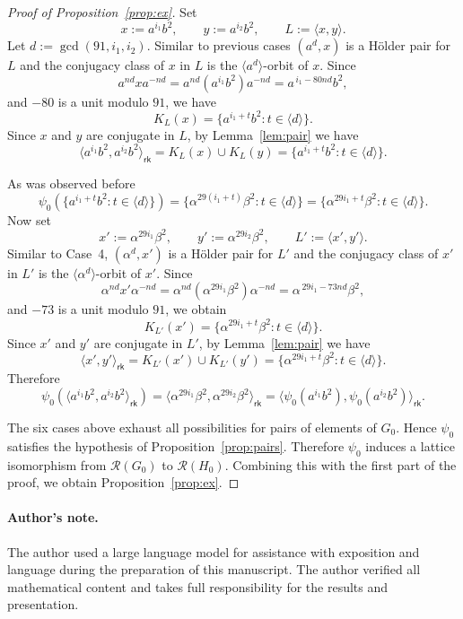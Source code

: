 \documentclass[a4paper,12pt]{article}
\theoremstyle{definition}
\theoremstyle{remark}
\begin{document}
\begin{proof}[Proof of Proposition~\ref{prop:ex}]
  \medskip
  Set
  $$ x:=a^{i_1}b^2,\qquad y:=a^{i_2}b^2,\qquad L:=\langle x,y\rangle. $$
  Let $d:=\gcd(91,i_1,i_2)$. Similar to previous cases $(a^d,x)$ is a Hölder pair for $L$ and the conjugacy class of $x$ in $L$ is the $\langle a^d\rangle$-orbit of $x$. Since
  $$ a^{nd}xa^{-nd}=a^{nd}(a^{i_1}b^2)a^{-nd}=a^{\,i_1-80nd}b^2, $$
  and $-80$ is a unit modulo $91$, we have
  $$ K_L(x)=\{a^{i_1+t}b^2:t\in \langle d\rangle\}. $$
  Since $x$ and $y$ are conjugate in $L$, by Lemma~\ref{lem:pair} we have
  $$ \langle a^{i_1}b^2,a^{i_2}b^2\rangle_{\mathsf{rk}} = K_L(x)\cup K_L(y) = \{a^{i_1+t}b^2 : t\in \langle d\rangle\}. $$
  
  As was observed before
  $$ \psi_0(\{a^{i_1+t}b^2:t\in \langle d\rangle\}) = \{\alpha^{29(i_1+t)}\beta^2:t\in \langle d\rangle\} = \{\alpha^{29i_1+t}\beta^2:t\in \langle d\rangle\}. $$
  Now set
  $$ x':=\alpha^{29i_1}\beta^2,\qquad y':=\alpha^{29i_2}\beta^2,\qquad L':=\langle x',y'\rangle. $$
  Similar to Case~4, $(\alpha^d,x')$ is a Hölder pair for $L'$ and the conjugacy class of $x'$ in $L'$ is the $\langle \alpha^d\rangle$-orbit of $x'$. Since
  $$ \alpha^{nd}x'\alpha^{-nd} = \alpha^{nd}(\alpha^{29i_1}\beta^2)\alpha^{-nd} = \alpha^{\,29i_1-73nd}\beta^2, $$
  and $-73$ is a unit modulo $91$, we obtain
  $$ K_{L'}(x')=\{\alpha^{29i_1+t}\beta^2:t\in \langle d\rangle\}. $$
  Since $x'$ and $y'$ are conjugate in $L'$, by Lemma~\ref{lem:pair} we have 
  $$ \langle x',y'\rangle_{\mathsf{rk}} = K_{L'}(x')\cup K_{L'}(y') = \{\alpha^{29i_1+t}\beta^2:t\in \langle d\rangle\}. $$
  Therefore
  $$ \psi_0(\langle a^{i_1}b^2,a^{i_2}b^2\rangle_{\mathsf{rk}}) = \langle \alpha^{29i_1}\beta^2,\alpha^{29i_2}\beta^2\rangle_{\mathsf{rk}} = \langle \psi_0(a^{i_1}b^2),\psi_0(a^{i_2}b^2)\rangle_{\mathsf{rk}}. $$
  
  
  
  \medskip
  The six cases above exhaust all possibilities for pairs of elements of $G_0$. Hence $\psi_0$ satisfies the hypothesis of Proposition~\ref{prop:pairs}. Therefore $\psi_0$ induces a lattice isomorphism from $\mathcal{R}(G_0)$ to $\mathcal{R}(H_0)$. Combining this with the first part of the proof, we obtain Proposition~\ref{prop:ex}.
  
  
\end{proof}


\paragraph{Author's note.}
The author used a large language model for assistance with exposition and language during the preparation of this manuscript. The author verified all mathematical content and takes full responsibility for the results and presentation.
\end{document}
